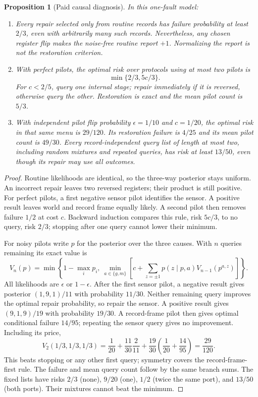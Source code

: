 \documentclass[12pt]{article}
\newtheorem{proposition}[theorem]{Proposition}
\theoremstyle{definition}
\theoremstyle{remark}
\begin{document}
\begin{proposition}[Paid causal diagnosis]\label{prop:causal_diagnosis}
In this one-fault model:
\begin{enumerate}[itemsep=2pt]
\item Every repair selected only from routine records has failure
probability at least $2/3$, even with arbitrarily many such records.
Nevertheless, any chosen register flip makes the noise-free routine
report $+1$. Normalizing the report is not the restoration criterion.
\item With perfect pilots, the optimal risk over protocols using at
most two pilots is
\[
 \min\{2/3,5c/3\}.
\]
For $c<2/5$, query one internal stage; repair immediately if it is
reversed, otherwise query the other. Restoration is exact and the mean
pilot count is $5/3$.
\item With independent pilot flip probability $\epsilon=1/10$ and
$c=1/20$, the optimal risk in that same menu is $29/120$.
Its restoration failure is $4/25$ and its mean pilot count is $49/30$.
Every record-independent query list of length at most two, including
random mixtures and repeated queries, has risk at least $13/50$,
even though its repair may use all outcomes.
\end{enumerate}
\end{proposition}
\begin{proof}
Routine likelihoods are identical, so the three-way posterior stays
uniform. An incorrect repair leaves two reversed registers; their
product is still positive. For perfect pilots, a first negative
sensor pilot identifies the sensor. A positive result leaves world
and record frame equally likely. A second pilot then removes failure
$1/2$ at cost $c$. Backward induction compares this rule, risk $5c/3$,
to no query, risk $2/3$; stopping after one query cannot lower their
minimum.

For noisy pilots write $p$ for the posterior over the three causes.
With $n$ queries remaining its exact value is
\begin{equation}\label{eq:causal_bellman}
 V_n(p)=\min\left\{1-\max_i p_i,\ 
 \min_{a\in\{g,m\}}\left[c+
 \sum_{z=\pm1}p(z\mid p,a)V_{n-1}(p^{a,z})\right]\right\}.
\end{equation}
All likelihoods are $\epsilon$ or $1-\epsilon$. After the first
sensor pilot, a negative result gives posterior $(1,9,1)/11$
with probability $11/30$. Neither remaining query improves the
optimal repair probability, so repair the sensor.
A positive result gives $(9,1,9)/19$ with probability $19/30$.
A record-frame pilot then gives optimal conditional failure $14/95$;
repeating the sensor query gives no improvement. Including its price,
\[
 V_2(1/3,1/3,1/3)
 =\frac1{20}+\frac{11}{30}\frac2{11}
   +\frac{19}{30}\left(\frac1{20}+\frac{14}{95}\right)
 =\frac{29}{120}.
\]
This beats stopping or any other first query; symmetry covers the
record-frame-first rule. The failure and mean query count follow by
the same branch sums. The fixed lists have risks $2/3$ (none),
$9/20$ (one), $1/2$ (twice the same port), and $13/50$ (both ports).
Their mixtures cannot beat the minimum.
\end{proof}
\end{document}
